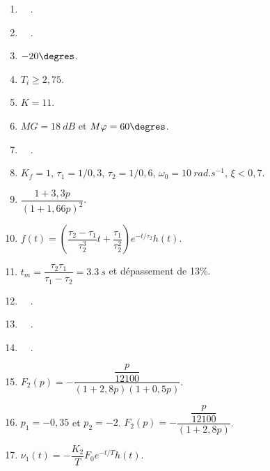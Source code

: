 \begin{solution}
\begin{multicols}{2}
\begin{enumerate}
\item $\quad$.
\item $\quad$.
\item $-20\degres$.
\item $T_i\geq 2,75$.
\item $K=11$.
\item $MG = \SI{18}{dB}$ et $M \varphi  = 60\degres$.
\item $\quad$.
\item $K_f=1$, $\tau_1=1/0,3$, $\tau_2=1/0,6$, $\omega_0=\SI{10}{rad.s^{-1}}$, $\xi<0,7$.
\item $\dfrac{1+3,3 p}{\left(1+1,66 p\right)^2}$.
\item $f(t)=\left( \dfrac{\tau_2-\tau_1}{\tau_2^3}t+\dfrac{\tau_1}{\tau_2^2}\right) e^{-t/\tau_2}h(t)$.
\item $t_m=\dfrac{\tau_2\tau_1}{\tau_1-\tau_2}=\SI{3,3}{s}$ et dépassement de 13\%.
\item $\quad$.
\item $\quad$.
\item $\quad$.
\item $F_2(p)=-\dfrac{\dfrac{p}{12100}}{\left(1+2,8p\right)\left(1+0,5p\right)}$.
\item $p_1=-0,35$ et $p_2=-2$. $F_2(p)=-\dfrac{\dfrac{p}{12100}}{\left(1+2,8p\right)}$.
\item $\nu_1(t)=-\dfrac{K_2}{T}F_0 e^{-t/T}h(t)$.
\end{enumerate} 
\end{multicols}
\end{solution}
 